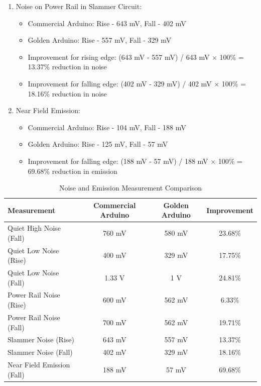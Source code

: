 \documentclass[a4paper,11pt]{article}%
\begin{document}
\begin{enumerate}
	\item Noise on Power Rail in Slammer Circuit:
	\begin{itemize}
		\item Commercial Arduino: Rise - 643 mV, Fall - 402 mV
		\item Golden Arduino: Rise - 557 mV, Fall - 329 mV
		\item Improvement for rising edge: (643 mV - 557 mV) / 643 mV × 100\% = 13.37\% reduction in noise
		\item Improvement for falling edge: (402 mV - 329 mV) / 402 mV × 100\% = 18.16\% reduction in noise
	\end{itemize}
	\item Near Field Emission:
	\begin{itemize}
		\item Commercial Arduino: Rise - 104 mV, Fall - 188 mV
		\item Golden Arduino: Rise - 125 mV, Fall - 57 mV
		\item Improvement for falling edge: (188 mV - 57 mV) / 188 mV × 100\% = 69.68\% reduction in emission
	\end{itemize}
	
\end{enumerate}


\begin{table}[H]
    \centering
    \begin{tabular}{|l|c|c|c|}
        \hline
        \textbf{Measurement} & \textbf{Commercial Arduino} & \textbf{Golden Arduino} & \textbf{Improvement} \\
        \hline
        Quiet High Noise (Fall) & 760 mV & 580 mV & 23.68\% \\
        Quiet Low Noise (Rise) & 400 mV & 329 mV & 17.75\% \\
        Quiet Low Noise (Fall) & 1.33 V & 1 V & 24.81\% \\
        Power Rail Noise (Rise) & 600 mV & 562 mV & 6.33\% \\
        Power Rail Noise (Fall) & 700 mV & 562 mV & 19.71\% \\
        Slammer Noise (Rise) & 643 mV & 557 mV & 13.37\% \\
        Slammer Noise (Fall) & 402 mV & 329 mV & 18.16\% \\
        Near Field Emission (Fall) & 188 mV & 57 mV & 69.68\% \\
        \hline
    \end{tabular}
    \caption{Noise and Emission Measurement Comparison}
    \label{tab:noise_emission}
\end{table}
\end{document}
